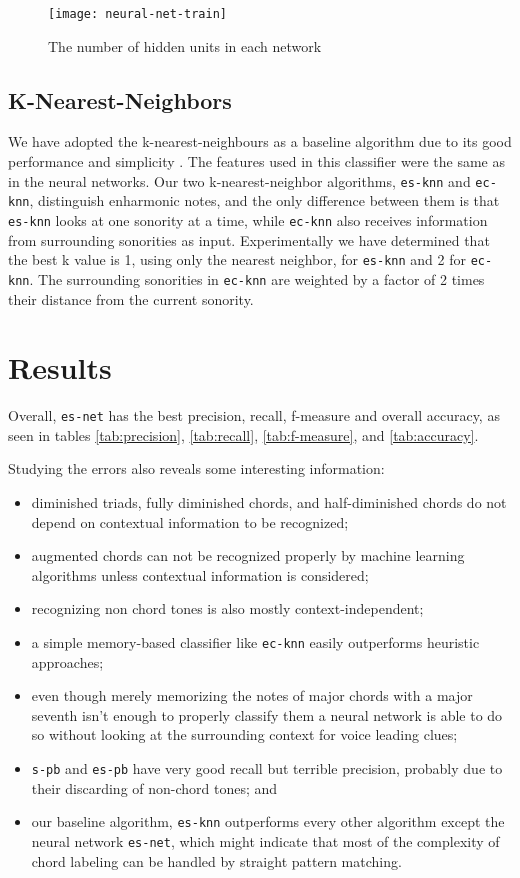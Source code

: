 \documentclass{article}
\begin{document}
\begin{figure}
  \centering
  \texttt{[image: neural-net-train]}
  \caption{The number of hidden units in each network}
  \label{fig:hidden-units}
\end{figure}


\subsection{K-Nearest-Neighbors}
\label{sec:knn}

We have adopted the k-nearest-neighbours as a baseline algorithm due
to its good performance and simplicity \cite{fix.ea:important,
  gomez.ea:estimating}. The features used in this classifier were the
same as in the neural networks. Our two k-nearest-neighbor algorithms,
\texttt{es-knn} and \texttt{ec-knn}, distinguish enharmonic notes, and
the only difference between them is that \texttt{es-knn} looks at one
sonority at a time, while \texttt{ec-knn} also receives information
from surrounding sonorities as input. Experimentally we have
determined that the best k value is 1, using only the nearest
neighbor, for \texttt{es-knn} and 2 for \texttt{ec-knn}. The
surrounding sonorities in \texttt{ec-knn} are weighted by a factor of
2 times their distance from the current sonority.

\section{Results}
\label{sec:discussion}


Overall, \texttt{es-net} has the best precision, recall, f-measure and
overall accuracy, as seen in tables \ref{tab:precision},
\ref{tab:recall}, \ref{tab:f-measure}, and \ref{tab:accuracy}.

Studying the errors also reveals some interesting information:
\begin{itemize}
\item diminished triads, fully diminished chords, and half-diminished
  chords do not depend on contextual information to be recognized;
\item augmented chords can not be recognized properly by machine
  learning algorithms unless contextual information is considered;
\item recognizing non chord tones is also mostly context-independent;
\item a simple memory-based classifier like \texttt{ec-knn} easily
  outperforms heuristic approaches;
\item even though merely memorizing the notes of major chords with a
  major seventh isn't enough to properly classify them a neural
  network is able to do so without looking at the surrounding context
  for voice leading clues;
\item \texttt{s-pb} and \texttt{es-pb} have very good recall but
  terrible precision, probably due to their discarding of non-chord
  tones; and
\item our baseline algorithm, \texttt{es-knn} outperforms every other
  algorithm except the neural network \texttt{es-net}, which might
  indicate that most of the complexity of chord labeling can be
  handled by straight pattern matching.
\end{itemize}
\end{document}

